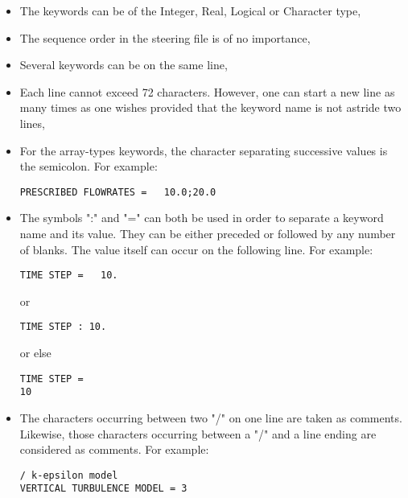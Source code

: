 \begin{itemize}
\item The keywords can be of the Integer, Real, Logical or Character type,

\item The sequence order in the steering file is of no importance,

\item Several keywords can be on the same line,

\item Each line cannot exceed 72 characters. However, one can start a new line
as many times as one wishes provided that the keyword name is not astride two
lines,

\item For the array-types keywords, the character separating successive values
is the semicolon. For example:

\begin{lstlisting}[language=TelemacCas]
PRESCRIBED FLOWRATES =   10.0;20.0
\end{lstlisting}

\item The symbols ":" and "=" can both be used in order to separate a keyword
name and its value. They can be either preceded or followed by any number of
blanks. The value itself can occur on the following line. For example:

\begin{lstlisting}[language=TelemacCas]
TIME STEP =   10.
\end{lstlisting}

or

\begin{lstlisting}[language=TelemacCas]
TIME STEP : 10.
\end{lstlisting}

or else

\begin{lstlisting}[language=TelemacCas]
TIME STEP =
10
\end{lstlisting}

\item The characters occurring between two "/" on one line are taken as
comments. Likewise, those characters occurring between a "/" and a line ending
are considered as comments. For example:

\begin{lstlisting}[language=TelemacCas]
/ k-epsilon model
VERTICAL TURBULENCE MODEL = 3
\end{lstlisting}


\end{itemize}
